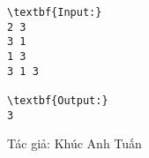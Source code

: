 \begin{verbatim}
\textbf{Input:}
2 3
3 1
1 3
3 1 3

\textbf{Output:}
3
\end{verbatim}

Tác giả: Khúc Anh Tuấn